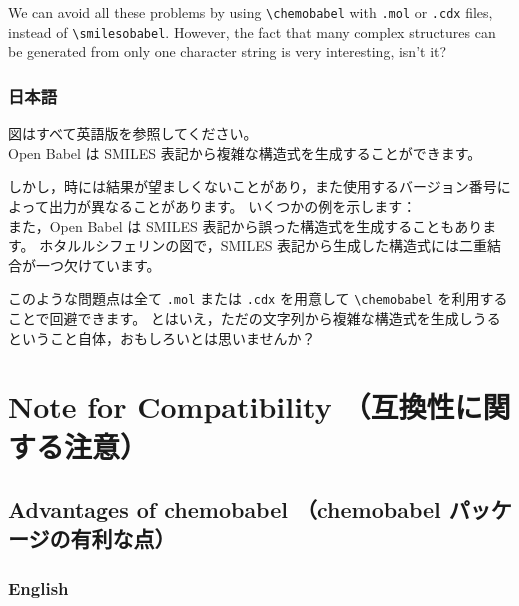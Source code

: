 \documentclass[12pt]{jsarticle}
\begin{document}
We can avoid all these problems by using \verb|\chemobabel| with \verb|.mol| or \verb|.cdx| files, instead of \verb|\smilesobabel|.
However, the fact that many complex structures can be generated from only one character string is very interesting, isn't it?

\subsubsection{日本語}

図はすべて英語版を参照してください。 \\

Open Babel は SMILES 表記から複雑な構造式を生成することができます。

しかし，時には結果が望ましくないことがあり，また使用するバージョン番号によって出力が異なることがあります。
いくつかの例を示します： \\

また，Open Babel は SMILES 表記から誤った構造式を生成することもあります。
ホタルルシフェリンの図で，SMILES 表記から生成した構造式には二重結合が一つ欠けています。

このような問題点は全て \verb|.mol| または \verb|.cdx| を用意して \verb|\chemobabel| を利用することで回避できます。
とはいえ，ただの文字列から複雑な構造式を生成しうるということ自体，おもしろいとは思いませんか？

\clearpage

\section{Note for Compatibility （互換性に関する注意）}

\subsection{Advantages of \textsf{chemobabel} （\textsf{chemobabel} パッケージの有利な点）}

\subsubsection{English}
\end{document}
